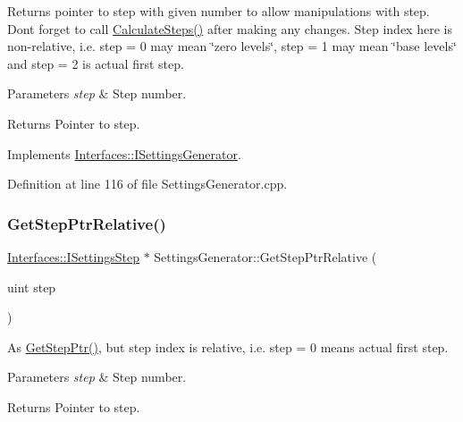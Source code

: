 Returns pointer to step with given number to allow manipulations with step. Don\textquotesingle{}t forget to call \hyperlink{class_settings_generator_a7c9c1a7a3928ba3ce0ad110593b97a96}{Calculate\+Steps()} after making any changes. Step index here is non-\/relative, i.\+e. step = 0 may mean \char`\"{}zero levels\char`\"{}, step = 1 may mean \char`\"{}base levels\char`\"{} and step = 2 is actual first step. 


\begin{DoxyParams}{Parameters}
{\em step} & Step number. \\
\hline
\end{DoxyParams}
\begin{DoxyReturn}{Returns}
Pointer to step. 
\end{DoxyReturn}


Implements \hyperlink{class_interfaces_1_1_i_settings_generator_af1b65a18c3ade3235715ae2e9cdbcfe0}{Interfaces\+::\+I\+Settings\+Generator}.



Definition at line 116 of file Settings\+Generator.\+cpp.

\mbox{\label{class_settings_generator_aa45d5a3c1349c18ac611ad960ff8470d}} 
\subsubsection{\texorpdfstring{Get\+Step\+Ptr\+Relative()}{GetStepPtrRelative()}}
{\footnotesize\ttfamily \hyperlink{class_interfaces_1_1_i_settings_step}{Interfaces\+::\+I\+Settings\+Step} $\ast$ Settings\+Generator\+::\+Get\+Step\+Ptr\+Relative (\begin{DoxyParamCaption}\item[{uint}]{step }\end{DoxyParamCaption})\hspace{0.3cm}{\ttfamily [virtual]}}



As \hyperlink{class_settings_generator_a37f4175a0ed24853b2f187f15505086b}{Get\+Step\+Ptr()}, but step index is relative, i.\+e. step = 0 means actual first step. 


\begin{DoxyParams}{Parameters}
{\em step} & Step number. \\
\hline
\end{DoxyParams}
\begin{DoxyReturn}{Returns}
Pointer to step. 
\end{DoxyReturn}


